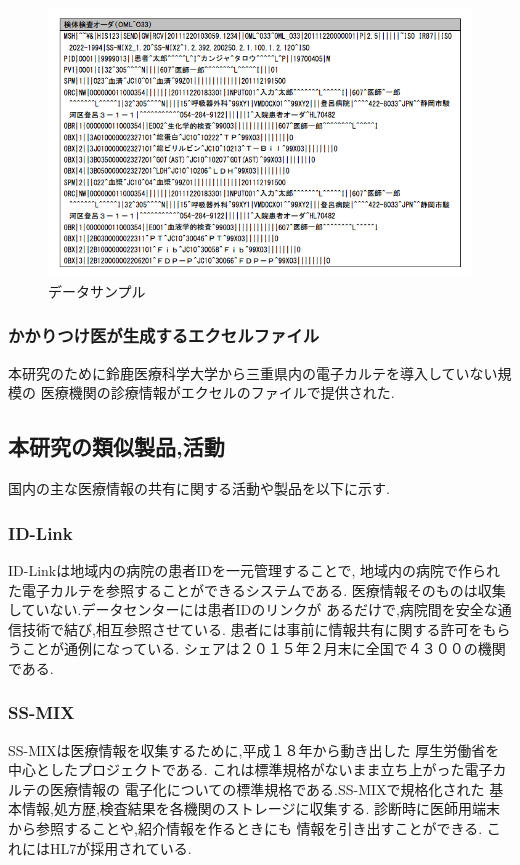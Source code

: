 	\begin{figure}[htbp]
    \begin{center}
			\includegraphics[width=12cm, bb=0 0 688 437, clip]{./gazou/ss-mix_sampledata.png}
    \end{center}
    \caption{データサンプル}
		\label{ss-mix_sampledata}
	\end{figure}



  \subsubsection{かかりつけ医が生成するエクセルファイル}
  本研究のために鈴鹿医療科学大学から三重県内の電子カルテを導入していない規模の
  医療機関の診療情報がエクセルのファイルで提供された.



\subsection{本研究の類似製品,活動}
  国内の主な医療情報の共有に関する活動や製品を以下に示す.


  \subsubsection{ID-Link}
    ID-Linkは地域内の病院の患者IDを一元管理することで,
    地域内の病院で作られた電子カルテを参照することができるシステムである.
    医療情報そのものは収集していない.データセンターには患者IDのリンクが
    あるだけで,病院間を安全な通信技術で結び,相互参照させている.
    患者には事前に情報共有に関する許可をもらうことが通例になっている.
    シェアは２０１５年２月末に全国で４３００の機関である.

  \subsubsection{SS-MIX} \cite{bibi7}
    SS-MIXは医療情報を収集するために,平成１８年から動き出した
    厚生労働省を中心としたプロジェクトである.
    これは標準規格がないまま立ち上がった電子カルテの医療情報の
    電子化についての標準規格である.SS-MIXで規格化された
    基本情報,処方歴,検査結果を各機関のストレージに収集する.
    診断時に医師用端末から参照することや,紹介情報を作るときにも
    情報を引き出すことができる.
    これにはHL7が採用されている.

